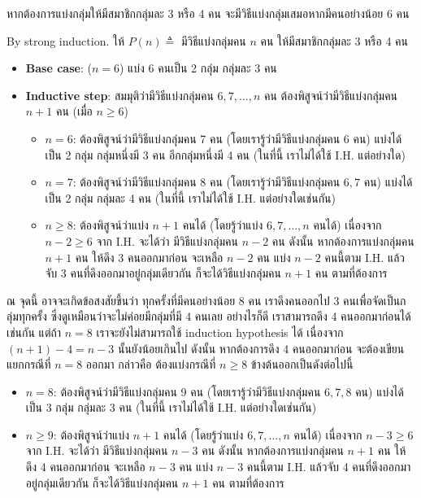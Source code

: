 \begin{theorem}
หากต้องการแบ่งกลุ่มให้มีสมาชิกกลุ่มละ 3 หรือ 4 คน จะมีวิธีแบ่งกลุ่มเสมอหากมีคนอย่างน้อย 6 คน
\begin{pf}
By strong induction.  ให้ $P(n)\triangleq$ มีวิธีแบ่งกลุ่มคน $n$ คน ให้มีสมาชิกกลุ่มละ 3 หรือ 4 คน
\begin{itemize}
\item {\bf Base case}: ($n=6$) \quad แบ่ง 6 คนเป็น 2 กลุ่ม กลุ่มละ 3 คน \quad\yea
\item {\bf Inductive step}: สมมุติว่ามีวิธีแบ่งกลุ่มคน $6,7,\ldots,n$ คน ต้องพิสูจน์ว่ามีวิธีแบ่งกลุ่มคน $n+1$ คน (เมื่อ $n\geq 6$)
\begin{itemize}
\item $n=6$: ต้องพิสูจน์ว่ามีวิธีแบ่งกลุ่มคน 7 คน (โดยเรารู้ว่ามีวิธีแบ่งกลุ่มคน 6 คน) \enskip แบ่งได้เป็น 2 กลุ่ม กลุ่มหนึ่งมี 3 คน อีกกลุ่มหนึ่งมี 4 คน (ในที่นี้ เราไม่ได้ใช้ I.H. แต่อย่างใด)
\item $n=7$: ต้องพิสูจน์ว่ามีวิธีแบ่งกลุ่มคน 8 คน (โดยเรารู้ว่ามีวิธีแบ่งกลุ่มคน $6,7$ คน) \enskip แบ่งได้เป็น 2 กลุ่ม กลุ่มละ 4 คน (ในที่นี้ เราไม่ได้ใช้ I.H. แต่อย่างใดเช่นกัน)
\item $n\geq 8$: ต้องพิสูจน์ว่าแบ่ง $n+1$ คนได้ (โดยรู้ว่าแบ่ง $6,7,\ldots,n$ คนได้) \enskip เนื่องจาก $n-2\geq 6$ จาก I.H. จะได้ว่า มีวิธีแบ่งกลุ่มคน $n-2$ คน \enskip ดังนั้น หากต้องการแบ่งกลุ่มคน $n+1$ คน ให้ดึง 3 คนออกมาก่อน จะเหลือ $n-2$ คน \enskip แบ่ง $n-2$ คนนี้ตาม I.H. แล้วจับ 3 คนที่ดึงออกมาอยู่กลุ่มเดียวกัน ก็จะได้วิธีแบ่งกลุ่มคน $n+1$ คน ตามที่ต้องการ \quad\yea
\end{itemize}
\end{itemize}
\end{pf}
ณ จุดนี้ อาจจะเกิดข้อสงสัยขึ้นว่า ทุกครั้งที่มีคนอย่างน้อย 8 คน เราดึงคนออกไป 3 คนเพื่อจัดเป็นกลุ่มทุกครั้ง ซึ่งดูเหมือนว่าจะไม่ค่อยมีกลุ่มที่มี 4 คนเลย อย่างไรก็ดี เราสามารถดึง 4 คนออกมาก่อนได้เช่นกัน แต่ถ้า $n=8$ เราจะยังไม่สามารถใช้ induction hypothesis ได้ เนื่องจาก $(n+1)-4=n-3$ นั้นยังน้อยเกินไป \enskip ดังนั้น หากต้องการดึง 4 คนออกมาก่อน จะต้องเขียนแยกกรณีที่ $n=8$ ออกมา กล่าวคือ ต้องแบ่งกรณีที่ $n\geq 8$ ข้างต้นออกเป็นดังต่อไปนี้
\begin{itemize}
\item $n=8$: ต้องพิสูจน์ว่ามีวิธีแบ่งกลุ่มคน 9 คน (โดยเรารู้ว่ามีวิธีแบ่งกลุ่มคน $6,7,8$ คน) \enskip แบ่งได้เป็น 3 กลุ่ม กลุ่มละ 3 คน (ในที่นี้ เราไม่ได้ใช้ I.H. แต่อย่างใดเช่นกัน)
\item $n\geq 9$: ต้องพิสูจน์ว่าแบ่ง $n+1$ คนได้ (โดยรู้ว่าแบ่ง $6,7,\ldots,n$ คนได้) \enskip เนื่องจาก $n-3\geq 6$ จาก I.H. จะได้ว่า มีวิธีแบ่งกลุ่มคน $n-3$ คน \enskip ดังนั้น หากต้องการแบ่งกลุ่มคน $n+1$ คน ให้ดึง 4 คนออกมาก่อน จะเหลือ $n-3$ คน \enskip แบ่ง $n-3$ คนนี้ตาม I.H. แล้วจับ 4 คนที่ดึงออกมาอยู่กลุ่มเดียวกัน ก็จะได้วิธีแบ่งกลุ่มคน $n+1$ คน ตามที่ต้องการ
\end{itemize}
\end{theorem}

